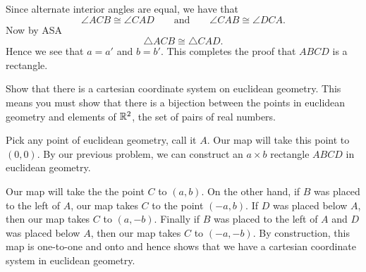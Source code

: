 \documentclass[newpage,hints,handout]{ximera}
\begin{document}
\begin{problem}
\begin{freeResponse}
\begin{image}
\begin{tikzpicture}[geometryDiagrams]
\end{tikzpicture}
\end{image}
Since alternate interior angles are equal, we have that
\[
\angle ACB \cong \angle CAD\qquad\text{and}\qquad \angle CAB \cong \angle DCA.
\]
Now by ASA
\[
\triangle ACB \cong \triangle CAD.
\]
Hence we see that $a = a'$ and $b = b'$. This completes the proof that
$ABCD$ is a rectangle.
\end{freeResponse}
\end{problem}



\begin{problem}
Show that there is a cartesian coordinate system on euclidean geometry. This
means you must show that there is a bijection between the points in
euclidean geometry and elements of $\R^2$, the set of pairs of real numbers.

\begin{freeResponse}
Pick any point of euclidean geometry, call it $A$. Our map will take this
point to $(0,0)$. By our previous problem, we can construct an
$a\times b$ rectangle $ABCD$ in euclidean geometry.
\begin{image}
\end{image}
Our map will take the the point $C$ to $(a,b)$. On the other hand, if
$B$ was placed to the left of $A$, our map takes $C$ to the point
$(-a,b)$. If $D$ was placed below $A$, then our map takes $C$ to
$(a,-b)$. Finally if $B$ was placed to the left of $A$ and $D$ was
placed below $A$, then our map takes $C$ to $(-a,-b)$.  By
construction, this map is one-to-one and onto and hence shows that we
have a cartesian coordinate system in euclidean geometry.
\end{freeResponse}

\end{problem}
\end{document}

